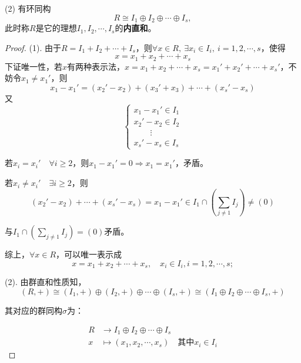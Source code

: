 \documentclass[12pt, a4paper, oneside]{ctexart}
\begin{document}
(2) 有环同构
\begin{equation*}
    R\cong I_1\oplus I_2\oplus\cdots\oplus I_s,
\end{equation*}
此时称$R$是它的理想$I_1,I_2,\cdots,I_s$的\textbf{内直和}。
\begin{proof}
    (1). 由于$R = I_1+I_2+\cdots+I_s$，则$\forall x \in R,\ \exists x_i\in I_i,\  i=1,2,\cdots,s$，使得
    \begin{equation*}
        x = x_1+x_2+\cdots+x_s
    \end{equation*}
    下证唯一性，若$x$有两种表示法，$x = x_1+x_2+\cdots+x_s = x_1'+x_2'+\cdots+x_s'$，不妨令$x_1\neq x_1'$，则
    \begin{equation*}
        x_1-x_1' = (x_2'-x_2)+(x_3'+x_3)+\cdots+(x_s'-x_s)
    \end{equation*}
    又
    \begin{equation*}
        \begin{cases}
            x_1-x_1'\in I_1\\
            x_2'-x_2\in I_2\\
            \quad\quad\vdots\\
            x_s'-x_s\in I_s
        \end{cases}
    \end{equation*}

    若$x_i=x_i'\quad \forall i\geqslant 2$，则$x_1-x_1' = 0\Rightarrow x_1=x_1'$，矛盾。

    若$x_i\neq x_i'\quad \exists i\geqslant 2$，则
    \begin{equation*}
        (x_2'-x_2)+\cdots+(x_s'-x_s) = x_1-x_1'\in I_1\cap(\sum_{j\neq 1}I_j)\neq (0)
    \end{equation*}

    与$I_1\cap(\sum_{j\neq 1}I_j)= (0)$矛盾。

    综上，$\forall x\in R$，可以唯一表示成
    \begin{equation*}
        x = x_1+x_2+\cdots+x_s,\quad x_i\in I_i,i = 1, 2,\cdots, s;
    \end{equation*}

    (2). 由群直和性质知，
    \begin{equation*}
        (R,+)\cong(I_1,+)\oplus(I_2,+)\oplus\cdots\oplus(I_s,+)\cong(I_1\oplus I_2\oplus\cdots\oplus I_s,+)
    \end{equation*}

    其对应的群同构$\sigma$为：

    \begin{equation*}
        \begin{aligned}
            R&\rightarrow I_1\oplus I_2\oplus\cdots\oplus I_s\\
            x&\mapsto (x_1,x_2,\cdots,x_s)\quad \text{其中}x_i\in I_i
        \end{aligned}
    \end{equation*}


\end{proof}
\end{document}
